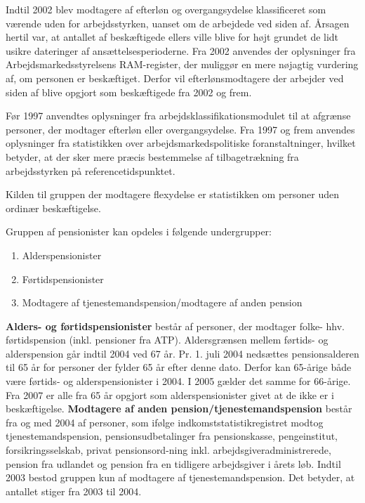 {Indtil 2002 blev modtagere af efterløn og overgangsydelse klassificeret som værende uden for arbejdsstyrken, uanset om de arbejdede ved siden af. Årsagen hertil var, at antallet af beskæftigede ellers ville blive for højt grundet de lidt usikre dateringer af ansættelsesperioderne. Fra 2002 anvendes der oplysninger fra Arbejdsmarkedsstyrelsens RAM-register, der muliggør en mere nøjagtig vurdering af, om personen er beskæftiget. Derfor vil efterlønsmodtagere der arbejder ved siden af blive opgjort som beskæftigede fra 2002 og frem.

Før 1997 anvendtes oplysninger fra arbejdsklassifikationsmodulet til at afgrænse personer, der modtager efterløn eller overgangsydelse. Fra 1997 og frem anvendes oplysninger fra statistikken over arbejdsmarkedspolitiske foranstaltninger, hvilket betyder, at der sker mere præcis bestemmelse af tilbagetrækning fra arbejdsstyrken på referencetidspunktet.

Kilden til gruppen der modtagere flexydelse er statistikken om personer uden ordinær beskæftigelse.

Gruppen af pensionister kan opdeles i følgende undergrupper:
\begin{enumerate} [topsep=6pt,itemsep=-1ex]
  \item Alderspensionister
  \item Førtidspensionister
  \item Modtagere af tjenestemandspension/modtagere af anden pension
\end{enumerate}

\textbf{Alders- og førtidspensionister} består af personer, der modtager folke- hhv. førtidspension (inkl. pensioner fra ATP). Aldersgrænsen mellem førtids- og alderspension går indtil 2004 ved 67 år. Pr. 1. juli 2004 nedsættes pensionsalderen til 65 år for personer der fylder 65 år efter denne dato. Derfor kan 65-årige både være førtids- og alderspensionister i 2004. I 2005 gælder det samme for 66-årige. Fra 2007 er alle fra 65 år opgjort som alderspensionister givet at de ikke er i beskæftigelse. \textbf{Modtagere af anden pension/tjenestemandspension} består fra og med 2004 af personer, som ifølge indkomststatistikregistret modtog tjenestemandspension, pensionsudbetalinger fra pensionskasse, pengeinstitut, forsikringsselskab, privat pensionsord-ning inkl. arbejdsgiveradministrerede, pension fra udlandet og pension fra en tidligere arbejdsgiver i årets løb. Indtil 2003 bestod gruppen kun af modtagere af tjenestemandspension. Det betyder, at antallet stiger fra 2003 til 2004.

}

